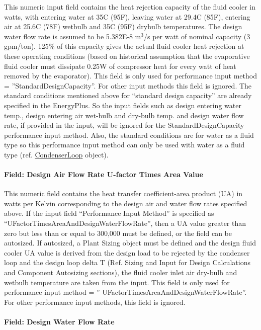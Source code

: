 This numeric input field contains the heat rejection capacity of the fluid cooler in watts, with entering water at 35C (95F), leaving water at 29.4C (85F), entering air at 25.6C (78F) wetbulb and 35C (95F) drybulb temperatures. The design water flow rate is assumed to be 5.382E-8 m\(^{3}\)/s per watt of nominal capacity (3 gpm/ton). 125\% of this capacity gives the actual fluid cooler heat rejection at these operating conditions (based on historical assumption that the evaporative fluid cooler must dissipate 0.25W of compressor heat for every watt of heat removed by the evaporator). This field is only used for performance input method = ''StandardDesignCapacity''. For other input methods this field is ignored. The standard conditions mentioned above for ``standard design capacity'' are already specified in the EnergyPlus. So the input fields such as design entering water temp., design entering air wet-bulb and dry-bulb temp. and design water flow rate, if provided in the input, will be ignored for the StandardDesignCapacity performance input method. Also, the standard conditions are for water as a fluid type so this performance input method can only be used with water as a fluid type (ref. \hyperref[condenserloop]{CondenserLoop} object).

\paragraph{Field: Design Air Flow Rate U-factor Times Area Value}\label{field-design-air-flow-rate-u-factor-times-area-value-1}

This numeric field contains the heat transfer coefficient-area product (UA) in watts per Kelvin corresponding to the design air and water flow rates specified above. If the input field ``Performance Input Method'' is specified as ``UFactorTimesAreaAndDesignWaterFlowRate'', then a UA value greater than zero but less than or equal to 300,000 must be defined, or the field can be autosized. If autosized, a Plant Sizing object must be defined and the design fluid cooler UA value is derived from the design load to be rejected by the condenser loop and the design loop delta T (Ref. Sizing and Input for Design Calculations and Component Autosizing sections), the fluid cooler inlet air dry-bulb and wetbulb temperature are taken from the input. This field is only used for performance input method = '' UFactorTimesAreaAndDesignWaterFlowRate''. For other performance input methods, this field is ignored.

\paragraph{Field: Design Water Flow Rate}\label{field-design-water-flow-rate-4}

